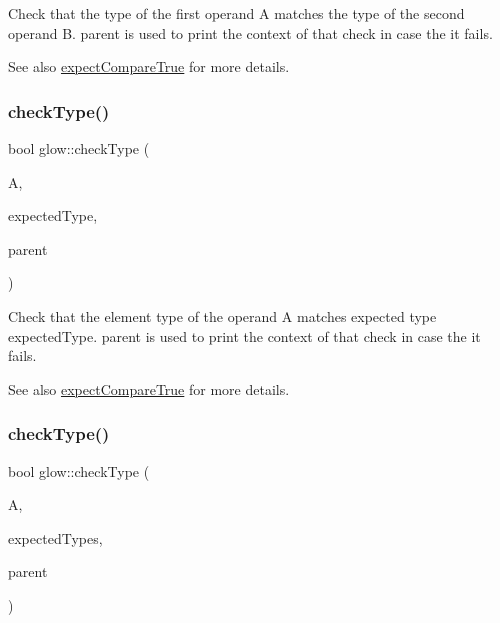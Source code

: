 Check that the type of the first operand {\ttfamily A} matches the type of the second operand {\ttfamily B}. {\ttfamily parent} is used to print the context of that check in case the it fails. \begin{DoxySeeAlso}{See also}
\hyperlink{namespaceglow_afd8e77c649bf3668467058ae071bb875}{expect\+Compare\+True} for more details. 
\end{DoxySeeAlso}
\mbox{\label{namespaceglow_a5321bd4a40acf901a0d9b8eb2e25f4ae}} 
\subsubsection{\texorpdfstring{check\+Type()}{checkType()}\hspace{0.1cm}{\footnotesize\ttfamily [1/2]}}
{\footnotesize\ttfamily bool glow\+::check\+Type (\begin{DoxyParamCaption}\item[{\hyperlink{structglow_1_1_node_value}{Node\+Value}}]{A,  }\item[{\hyperlink{namespaceglow_ab92e14a94329daf4083db670e95fbcdf}{Elem\+Kind}}]{expected\+Type,  }\item[{const \hyperlink{classglow_1_1_node}{Node} $\ast$}]{parent }\end{DoxyParamCaption})}

Check that the element type of the operand {\ttfamily A} matches expected type {\ttfamily expected\+Type}. {\ttfamily parent} is used to print the context of that check in case the it fails. \begin{DoxySeeAlso}{See also}
\hyperlink{namespaceglow_afd8e77c649bf3668467058ae071bb875}{expect\+Compare\+True} for more details. 
\end{DoxySeeAlso}
\mbox{\label{namespaceglow_a06107a1368ca70c82884f7a7863a0599}} 
\subsubsection{\texorpdfstring{check\+Type()}{checkType()}\hspace{0.1cm}{\footnotesize\ttfamily [2/2]}}
{\footnotesize\ttfamily bool glow\+::check\+Type (\begin{DoxyParamCaption}\item[{\hyperlink{structglow_1_1_node_value}{Node\+Value}}]{A,  }\item[{llvm\+::\+Array\+Ref$<$ \hyperlink{namespaceglow_ab92e14a94329daf4083db670e95fbcdf}{Elem\+Kind} $>$}]{expected\+Types,  }\item[{const \hyperlink{classglow_1_1_node}{Node} $\ast$}]{parent }\end{DoxyParamCaption})}

